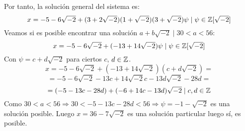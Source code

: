 \documentclass[12pt]{article}
\begin{document}
\begin{ejercicio}[2.5 puntos]
        \noindent
        Por tanto, la solución general del sistema es:
        $$x = -5-6\sqrt{-2} + (3+2\sqrt{-2})(1+\sqrt{-2})(3+\sqrt{-2})\psi \mid \psi \in \mathbb{Z}[\sqrt{-2}]$$
        \newpage
        \noindent
        Veamos si es posible encontrar una solución $a+b\sqrt{-2} \mid 30 < a < 56$:\\

        \noindent
        $$x = -5-6\sqrt{-2} + (-13+14\sqrt{-2})\psi \mid \psi \in \mathbb{Z}[\sqrt{-2}]$$
        Con $\psi = c+d\sqrt{-2}$ para ciertos $c$, $d \in \mathbb{Z}$.
        $$x = -5-6\sqrt{-2} + (-13+14\sqrt{-2})(c+d\sqrt{-2}) =$$ 
        $$ = -5-6\sqrt{-2} -13c + 14\sqrt{-2}c-13d\sqrt{-2}-28d =$$
        $$= (-5-13c-28d)+(-6+14c-13d)\sqrt{-2} \mid c,d \in \mathbb{Z}$$
        Como $30 < a < 56 \Rightarrow 30 < -5-13c-28d<56 \Rightarrow \psi = -1-\sqrt{-2}$ es una solución posible.\newline
        Luego $x = 36 -7\sqrt{-2}$ es una solución particular luego sí, es posible.

    \end{ejercicio}
\end{document}
